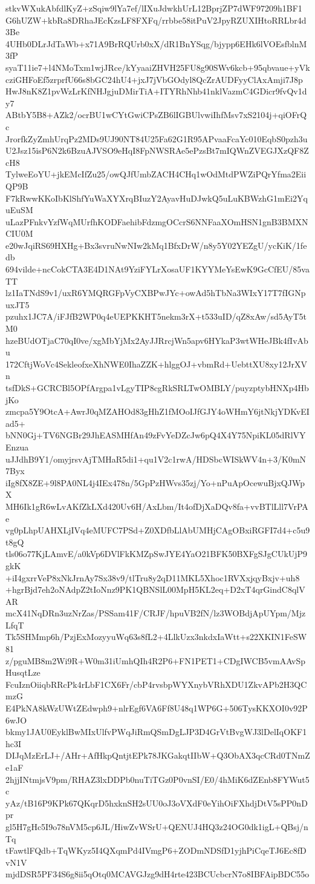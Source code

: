 stkvWXukAbfdlKyZ+zSqiw9lYa7ef/lIXuJdwkhUrL12BprjZP7dWF97209h1BF1
G6hUZW+kbRa8DRhaJEcKzsLF8FXFq/rrbbe58itPuV2JpyRZUXIHtoRRLbr4d3Be
4UHb0DLrJdTaWb+x71A9BrRQUrb0xX/dR1BnYSqg/bjypp6EHk6lVOEsfblnM3fP
syaT11ie7+l4NMoTxm1wjJRce/kYyaaiZHVH25FU8g90SWv6kcb+95qbvaue+yVk
cziGHFoEf5zrprfU66s8bGC24hU4+jxJ7jVbGOdyl8QcZrAUDFyyClAxAmji7J8p
HwJ8nK8Z1pvWzLrKfNHJgjuDMirTiA+ITYRhNhb41nklVazmC4GDicr9fvQv1dy7
ABtbY5B8+AZk2/ocrBU1wCYtGwiCPsZB6lIGBUlvwiIhfMsv7xS2104j+qiOFrQc
JrorfkZyZmhUrqPz2MDs9UJ90NT84U25Fa62G1R95APvaaFcaYc010EqbS0pzh3u
U2Jsz15isP6N2k6BzuAJVSO9eHqI8FpNWSRAe5ePzsBt7mIQWnZVEGJXzQF8ZcH8
TylweEoYU+jkEMcIfZu25/owQJfUmbZACH4CHq1wOdMtdPWZiPQrYfma2EiiQP9B
F7kRwwKKoIbKlShfYuWaXYXrqBIuzY2AyavHuDJwkQ5uLuKBWzhG1mEi2YquEuSM
uLazPFnkvYzfWqMUrfhKODFaehibFdzmgOCcrS6NNFaaXOmHSN1gnB3BMXNCIU0M
e20wJqiRS69HXHg+Bx3svruNwNIw2kMq1BfxDrW/n8y5Y02YEZgU/ycKiK/1fedb
694vilde+ncCokCTA3E4D1NAt9YziFYLrXosaUF1KYYMeYsEwK9GcCfEU/85vaTT
lz1IaTNdS9v1/uxR6YMQRGFpVyCXBPwJYc+owAd5hTbNa3WIxY17T7fIGNpuxJT5
pzuhx1JC7A/iFJfB2WP0q4eUEPKKHT5nekm3rX+t533uID/qZ8xAw/sd5AyT5tM0
hzeBUdOTjaC70qI0ve/xgMbYjMx2AyJJRrcjWn5apv6HYkaP3wtWHeJBk4fIvAbu
172CftjWoVc4SekleofxeXhNWE0IhaZZK+hlggOJ+vbmRd+UebttXU8xy12JrXVn
tsfDkS+GCRCBl5OPfArgpa1vLgyTIP8cgRkSRLTwOMBLY/puyzptybHNXp4HbjKo
zmcpa5Y9OtcA+AwrJ0qMZAHOd83gHhZ1fMOoIJfGJY4oWHmY6jtNkjYDKvEIad5+
bNN0Gj+TV6NGBr29JhEASMHfAn49zFvYeDZcJw6pQ4X4Y75NpiKL05dRlVYEnzua
uJJdhB9Y1/omyjrsvAjTMHaR5di1+qu1V2c1rwA/HDSbcWISkWV4n+3/K0mN7Byx
iIg8fX8ZE+9l8PA0NL4j4IEx478n/5GpPzHWvs35zj/Yo+nPuApOcewuBjxQJWpX
MH6Ik1gR6wLvAKfZkLXd420Uv6H/AxLbm/It4ofDjXaDQv8fa+vvBTlLll7VrPAe
vg0pLhpUAHXLjIVq4eMUFC7PSd+Z0XDfbLlAbUMHjCAgOBxiRGFI7d4+c5u9t8gQ
tls06o77KjLAmvE/a0kVp6DVlFkKMZpSwJYE4YaO21BFK50BXFgSJgCUkUjP9gkK
+iI4gxrrVeP8xNkJrnAy7Sx38v9/tlTru8y2qD11MKL5Xhoc1RVXxjqyBxjv+uh8
+hgrBjd7eh2oNAdpZ2tIoNnz9PK1QBNSlL00MpH5KL2eq+D2xT4qrGindC8qlVAR
mcX41NqDRn3uzNrZas/PSSam41F/CRJF/hpuVB2fN/lz3WOBdjApUYpm/MjzLfqT
Tk5SHMmp6h/PzjExMozyyuWq63s8fL2+4LlkUzx3nkdxIaWtt+s22XKIN1FeSW81
z/pguMB8m2Wi9R+W0m31iUmhQIh4R2P6+FN1PET1+CDgIWCB5vmAAvSpHusqtLze
FcuIznOiiqbRRcPk4rLbF1CX6Fr/cbP4rvsbpWYXnybVRhXDU1ZkvAPb2H3QCmzG
E4PkNA8kWzUWtZEdwph9+nlrEgf6VA6Ff8U48q1WP6G+506TysKKXOI0v92P6wJO
bkmy1JAU0EyklBwMIxUlfvPWqJiRmQSmDgLJP3D4GrVtBvgWJ3lDelIqOKF1hc3I
DIJqMzErLJ+/AHr+AfHkpQntjtEPk78JKGakqtIIbW+Q3ObAX3qcCRd0TNmZe1aF
2hjjINtmjsV9pm/RHAZ3lxDDPb0nuTiTGz0P0vnSI/E0/4hMiK6dZEnb8FYWut5c
yAz/tB16P9KPk67QKqrD5hxknSH2sUU0oJ3oVXdF0eYihOiFXhdjDtV5sPP0nDpr
gl5H7gHc5I9o78nVM5cp6JL/HiwZvWSrU+QENUJ4HQ3z24OG0dk1igL+QBsj/nTq
tFawtlFQdb+TqWKyz5I4QXqmPd4IVmgP6+ZODmNDSfD1yjhPiCqeTJ6Ec8fDvN1V
mjdDSR5PF34S6g8ii5qOtq0MCAVGJzg9dH4rte423BCUcbcrN7o8IBFAipBDC55o
